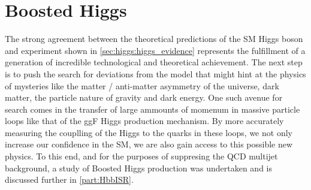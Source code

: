 \section{Boosted Higgs} \label{sec:higgs:boosted}

The strong agreement between the theoretical predictions of the SM Higgs boson
and experiment shown in \cref{sec:higgs:higgs_evidence} represents the
fulfillment of a generation of incredible technological and theoretical
achievement.  The next step is to push the search for deviations from the model
that might hint at the physics of mysteries like the matter / anti-matter
asymmetry of the universe, dark matter, the particle nature of gravity and dark
energy.  One such avenue for search comes in the transfer of large ammounts of
momenum in massive particle loops like that of the ggF Higgs production
mechanism.  By more accurately measuring the couplling of the Higgs to the
quarks in these loops, we not only increase our confidence in the SM, we are
also gain access to this possible new physics. To this end, and for the
purposes of suppresing the QCD multijet background, a study of Boosted Higgs
production was undertaken and is discussed further in \cref{part:HbbISR}.
